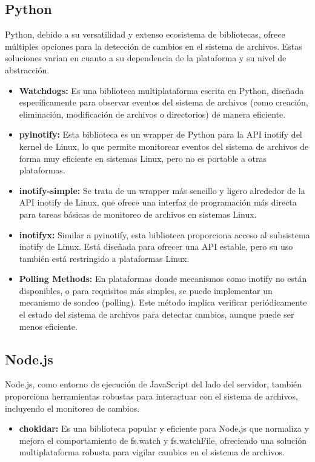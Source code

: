 \subsection{Python}
Python, debido a su versatilidad y extenso ecosistema de bibliotecas, ofrece múltiples opciones para la detección de cambios en el sistema de archivos. Estas soluciones varían en cuanto a su dependencia de la plataforma y su nivel de abstracción.
\begin{itemize}
\item \textbf{Watchdogs:} Es una biblioteca multiplataforma escrita en Python, diseñada específicamente para observar eventos del sistema de archivos (como creación, eliminación, modificación de archivos o directorios) de manera eficiente.
\item \textbf{pyinotify:} Esta biblioteca es un wrapper de Python para la API inotify del kernel de Linux, lo que permite monitorear eventos del sistema de archivos de forma muy eficiente en sistemas Linux, pero no es portable a otras plataformas.
\item \textbf{inotify-simple:} Se trata de un wrapper más sencillo y ligero alrededor de la API inotify de Linux, que ofrece una interfaz de programación más directa para tareas básicas de monitoreo de archivos en sistemas Linux.
\item \textbf{inotifyx:} Similar a pyinotify, esta biblioteca proporciona acceso al subsistema inotify de Linux. Está diseñada para ofrecer una API estable, pero su uso también está restringido a plataformas Linux.
\item \textbf{Polling Methods:} En plataformas donde mecanismos como inotify no están disponibles, o para requisitos más simples, se puede implementar un mecanismo de sondeo (polling). Este método implica verificar periódicamente el estado del sistema de archivos para detectar cambios, aunque puede ser menos eficiente.
\end{itemize}

\subsection{Node.js}
Node.js, como entorno de ejecución de JavaScript del lado del servidor, también proporciona herramientas robustas para interactuar con el sistema de archivos, incluyendo el monitoreo de cambios.
\begin{itemize}
\item \textbf{chokidar:} Es una biblioteca popular y eficiente para Node.js que normaliza y mejora el comportamiento de fs.watch y fs.watchFile, ofreciendo una solución multiplataforma robusta para vigilar cambios en el sistema de archivos.
\end{itemize}

